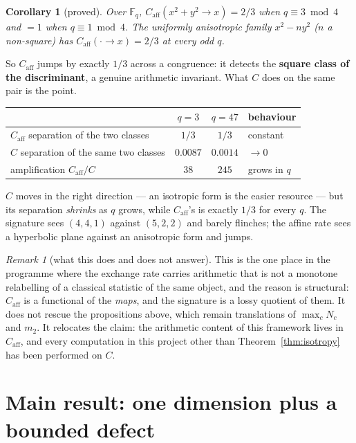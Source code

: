 \documentclass[11pt]{article}
\theoremstyle{plain}
\newtheorem{corollary}[theorem]{Corollary}
\theoremstyle{remark}
\newtheorem{remark}[theorem]{Remark}
\newcommand{\F}{\mathbb F}
\newcommand{\caff}{C_{\mathrm{aff}}}
\newcommand{\ra}{\rightarrow}
\begin{document}
\begin{corollary}[proved]\label{cor:congruence}
Over $\F_q$, $\caff(x^2+y^2 \ra x) = 2/3$ when $q \equiv 3 \bmod 4$ and $=1$
when $q \equiv 1 \bmod 4$.  The uniformly anisotropic family $x^2-ny^2$ ($n$ a
non-square) has $\caff(\cdot \ra x) = 2/3$ at every odd $q$.
\end{corollary}

So $\caff$ jumps by exactly $1/3$ across a congruence: it detects the
\textbf{square class of the discriminant}, a genuine arithmetic invariant.  What
$C$ does on the same pair is the point.

\begin{center}
\begin{tabular}{@{}lccl@{}}
\toprule
& $q=3$ & $q=47$ & behaviour \\
\midrule
$\caff$ separation of the two classes & $1/3$ & $1/3$ & constant \\
$C$ separation of the same two classes & $0.0087$ & $0.0014$ & $\to 0$ \\
amplification $\caff/C$ & $38$ & $245$ & grows in $q$ \\
\bottomrule
\end{tabular}
\end{center}

$C$ moves in the right direction --- an isotropic form is the easier resource
--- but its separation \emph{shrinks} as $q$ grows, while $\caff$'s is exactly
$1/3$ for every $q$.  The signature sees $(4,4,1)$ against $(5,2,2)$ and barely
flinches; the affine rate sees a hyperbolic plane against an anisotropic form
and jumps.

\begin{remark}[what this does and does not answer]
This is the one place in the programme where the exchange rate carries
arithmetic that is not a monotone relabelling of a classical statistic of the
same object, and the reason is structural: $\caff$ is a functional of the
\emph{maps}, and the signature is a lossy quotient of them.  It does not rescue
the propositions above, which remain translations of $\max_c N_c$ and $m_2$.  It
relocates the claim: the arithmetic content of this framework lives in $\caff$,
and every computation in this project other than Theorem~\ref{thm:isotropy} has
been performed on $C$.
\end{remark}

\section{Main result: one dimension plus a bounded defect}
\end{document}
